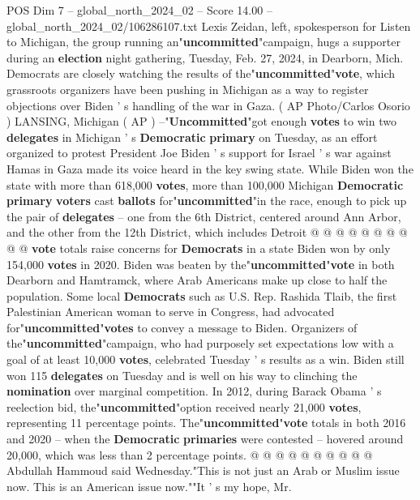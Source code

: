 \begin{textsample}{POS Dim 7 – global\_north\_2024\_02 – Score 14.00 – global\_north\_2024\_02/106286107.txt}  \label{ex:f7_pos_026}
Lexis Zeidan, left, spokesperson for Listen to Michigan, the group running an"\textbf{uncommitted}"campaign, hugs a supporter during an \textbf{election} night gathering, Tuesday, Feb. 27, 2024, in Dearborn, Mich.
Democrats are closely watching the results of the"\textbf{uncommitted}"\textbf{vote}, which grassroots organizers have been pushing in Michigan as a way to register objections over Biden ' s handling of the war in Gaza. ( AP Photo/Carlos Osorio ) LANSING, Michigan ( AP ) --"\textbf{Uncommitted}"got enough \textbf{votes} to win two \textbf{delegates} in Michigan ' s \textbf{Democratic} \textbf{primary} on Tuesday, as an effort organized to protest President Joe Biden ' s support for Israel ' s war against Hamas in Gaza made its voice heard in the key swing state.
While Biden won the state with more than 618,000 \textbf{votes}, more than 100,000 Michigan \textbf{Democratic} \textbf{primary} \textbf{voters} cast \textbf{ballots} for"\textbf{uncommitted}"in the race, enough to pick up the pair of \textbf{delegates} -- one from the 6th District, centered around Ann Arbor, and the other from the 12th District, which includes Detroit @ @ @ @ @ @ @ @ @ @ \textbf{vote} totals raise concerns for \textbf{Democrats} in a state Biden won by only 154,000 \textbf{votes} in 2020.
Biden was beaten by the"\textbf{uncommitted}"\textbf{vote} in both Dearborn and Hamtramck, where Arab Americans make up close to half the population.
Some local \textbf{Democrats} such as U.S.
Rep.
Rashida Tlaib, the first Palestinian American woman to serve in Congress, had advocated for"\textbf{uncommitted}"\textbf{votes} to convey a message to Biden.
Organizers of the"\textbf{uncommitted}"campaign, who had purposely set expectations low with a goal of at least 10,000 \textbf{votes}, celebrated Tuesday ' s results as a win.
Biden still won 115 \textbf{delegates} on Tuesday and is well on his way to clinching the \textbf{nomination} over marginal competition.
In 2012, during Barack Obama ' s reelection bid, the"\textbf{uncommitted}"option received nearly 21,000 \textbf{votes}, representing 11 percentage points.
The"\textbf{uncommitted}"\textbf{vote} totals in both 2016 and 2020 -- when the \textbf{Democratic} \textbf{primaries} were contested -- hovered around 20,000, which was less than 2 percentage points. @ @ @ @ @ @ @ @ @ @ Abdullah Hammoud said Wednesday."This is not just an Arab or Muslim issue now.
This is an American issue now.""It ' s my hope, Mr.

\end{textsample}
